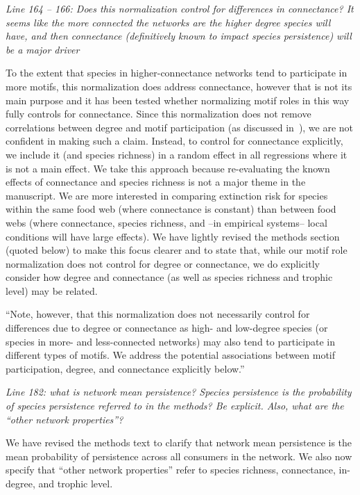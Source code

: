 \documentclass[12pt]{article}
\newcommand{\us}{\rm \setlength{\leftskip}{0.3cm} \setlength{\rightskip}{0.3cm}}
\newcommand{\them}{\it \setlength{\leftskip}{0cm} \setlength{\rightskip}{0cm}}
\begin{document}
        \them
        Line 164 – 166: Does this normalization control for differences in connectance? It seems like the more connected the networks are the higher degree species will have, and then connectance (definitively known to impact species persistence) will be a major driver
        
        \us To the extent that species in higher-connectance networks tend to participate in more motifs, this normalization does address connectance, however that is not its main purpose and it has been tested whether normalizing motif roles in this way fully controls for connectance.
        Since this normalization does not remove correlations between degree and motif participation (as discussed in~\citealp[]{Cirtwill2021_inprep}), we are not confident in making such a claim.
        Instead, to control for connectance explicitly, we include it (and species richness) in a random effect in all regressions where it is not a main effect. 
        We take this approach because re-evaluating the known effects of connectance and species richness is not a major theme in the manuscript.
        We are more interested in comparing extinction risk for species within the same food web (where connectance is constant) than between food webs (where connectance, species richness, and --in empirical systems-- local conditions will have large effects).
        We have lightly revised the methods section (quoted below) to make this focus clearer and to state that, while our motif role normalization does not control for degree or connectance, we do explicitly consider how degree and connectance (as well as species richness and trophic level) may be related. 
        
        
        
            ``Note, however, that this normalization does not necessarily control for differences due to degree or connectance as high- and low-degree species (or species in more- and less-connected networks) may also tend to participate in different types of motifs.
            We address the potential associations between motif participation, degree, and connectance explicitly below.''
        
        
        \them
        Line 182: what is network mean persistence? Species persistence is the probability of species persistence referred to in the methods? Be explicit. Also, what are the ``other network properties''?
        
        \us
        We have revised the methods text to clarify that network mean persistence is the mean probability of persistence across all consumers in the network. We also now specify that ``other network properties'' refer to species richness, connectance, in-degree, and trophic level.
        
\end{document}
